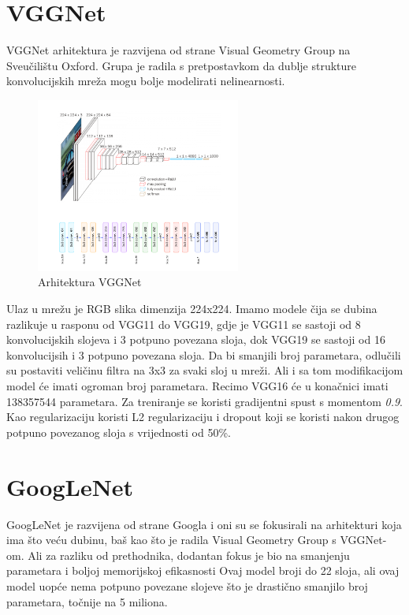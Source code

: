 \section{VGGNet}\label{sec:vggnet}
VGGNet arhitektura je razvijena od strane Visual Geometry Group na Sveučilištu Oxford.
Grupa je radila s pretpostavkom da dublje strukture konvolucijskih mreža mogu bolje modelirati nelinearnosti.

\FloatBarrier
\begin{figure}[h]
    \centering
    \includegraphics[width=0.6\textwidth]{images/VGGNet}
    \caption{Arhitektura VGGNet
    \protect\footnotemark}
    \label{fig:slika10}
\end{figure}
\FloatBarrier
{}
Ulaz u mrežu je RGB slika dimenzija 224x224.
Imamo modele čija se dubina razlikuje u rasponu od VGG11 do VGG19, gdje je VGG11 se sastoji od 8 konvolucijskih slojeva i 3 potpuno povezana sloja, dok VGG19 se sastoji od 16 konvolucijsih i 3 potpuno povezana sloja.
Da bi smanjili broj parametara, odlučili su postaviti veličinu filtra na 3x3 za svaki sloj u mreži.
Ali i sa tom modifikacijom model će imati ogroman broj parametara.
Recimo VGG16 će u konačnici imati 138357544 parametara.
Za treniranje se koristi gradijentni spust s momentom \emph{0.9}.
Kao regularizaciju koristi L2 regularizaciju i dropout koji se koristi nakon drugog potpuno povezanog sloja s vrijednosti od 50\%.

\section{GoogLeNet}\label{sec:googlenet}
GoogLeNet je razvijena od strane Googla i oni su se fokusirali na arhitekturi koja ima što veću dubinu, baš kao što je radila Visual Geometry Group s VGGNet-om.
Ali za razliku od prethodnika, dodantan fokus je bio na smanjenju parametara i boljoj memorijskoj efikasnosti
Ovaj model broji do 22 sloja, ali ovaj model uopće nema potpuno povezane slojeve što je drastično smanjilo broj parametara, točnije na 5 miliona.

